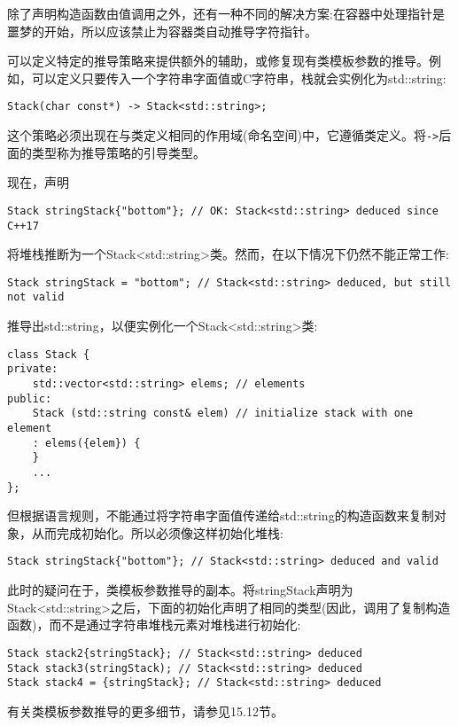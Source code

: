 除了声明构造函数由值调用之外，还有一种不同的解决方案:在容器中处理指针是噩梦的开始，所以应该禁止为容器类自动推导字符指针。

可以定义特定的推导策略来提供额外的辅助，或修复现有类模板参数的推导。例如，可以定义只要传入一个字符串字面值或C字符串，栈就会实例化为std::string:

\begin{lstlisting}[style=styleCXX]
Stack(char const*) -> Stack<std::string>;
\end{lstlisting}

这个策略必须出现在与类定义相同的作用域(命名空间)中，它遵循类定义。将\texttt{->}后面的类型称为推导策略的引导类型。

现在，声明

\begin{lstlisting}[style=styleCXX]
Stack stringStack{"bottom"}; // OK: Stack<std::string> deduced since C++17
\end{lstlisting}

将堆栈推断为一个Stack<std::string>类。然而，在以下情况下仍然不能正常工作:

\begin{lstlisting}[style=styleCXX]
Stack stringStack = "bottom"; // Stack<std::string> deduced, but still not valid
\end{lstlisting}

推导出std::string，以便实例化一个Stack<std::string>类:

\begin{lstlisting}[style=styleCXX]
class Stack {
private:
	std::vector<std::string> elems; // elements
public:
	Stack (std::string const& elem) // initialize stack with one element
	: elems({elem}) {
	}
	...
};
\end{lstlisting}

但根据语言规则，不能通过将字符串字面值传递给std::string的构造函数来复制对象，从而完成初始化。所以必须像这样初始化堆栈:

\begin{lstlisting}[style=styleCXX]
Stack stringStack{"bottom"}; // Stack<std::string> deduced and valid
\end{lstlisting}

此时的疑问在于，类模板参数推导的副本。将stringStack声明为Stack<std::string>之后，下面的初始化声明了相同的类型(因此，调用了复制构造函数)，而不是通过字符串堆栈元素对堆栈进行初始化:

\begin{lstlisting}[style=styleCXX]
Stack stack2{stringStack}; // Stack<std::string> deduced
Stack stack3(stringStack); // Stack<std::string> deduced
Stack stack4 = {stringStack}; // Stack<std::string> deduced
\end{lstlisting}

有关类模板参数推导的更多细节，请参见15.12节。





















